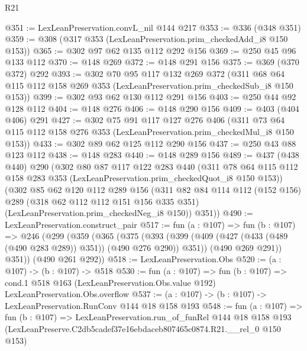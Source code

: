 \begin{lexlean}{R21}
\begin{coremodule}
@351 := LexLeanPreservation.convL_nil @144 @217
@353 := @336 (@348 @351)
@359 := @308 (@317 @353 (LexLeanPreservation.prim_checkedAdd_i8 @150 @153))
@365 := @302 @97 @62 @135 @112 @292 @156
@369 := @250 @45 @96 @133 @112
@370 := @148 @269
@372 := @148 @291 @156
@375 := @369 (@370 @372) @292
@393 := @302
    @70
    @95
    @117
    @132
    @269
    @372
    (@311 @68 @64 @115 @112 @158 @269 @353 (LexLeanPreservation.prim_checkedSub_i8 @150 @153))
@399 := @302 @93 @62 @130 @112 @291 @156
@403 := @250 @44 @92 @128 @112
@404 := @148 @276
@406 := @148 @290 @156
@409 := @403 (@404 @406) @291
@427 := @302
    @75
    @91
    @117
    @127
    @276
    @406
    (@311 @73 @64 @115 @112 @158 @276 @353 (LexLeanPreservation.prim_checkedMul_i8 @150 @153))
@433 := @302 @89 @62 @125 @112 @290 @156
@437 := @250 @43 @88 @123 @112
@438 := @148 @283
@440 := @148 @289 @156
@489 := @437
    (@438 @440)
    @290
    (@302
      @80
      @87
      @117
      @122
      @283
      @440
      (@311 @78 @64 @115 @112 @158 @283 @353 (LexLeanPreservation.prim_checkedQuot_i8 @150 @153))
      (@302
        @85
        @62
        @120
        @112
        @289
        @156
        (@311
          @82
          @84
          @114
          @112
          (@152 @156)
          @289
          (@318 @62 @112 @112 @151 @156 @335 @351)
          (LexLeanPreservation.prim_checkedNeg_i8 @150))
        @351))
@490 := LexLeanPreservation.construct_pair
@517 := fun (a : @107) =>
  fun (b : @107) =>
  @246
    (@299
      (@359
        (@365
          (@375
            (@393 (@399 (@409 (@427 (@433 (@489 (@490 @283 @289)) @351)) (@490 @276 @290)) @351))
            (@490 @269 @291))
          @351))
      (@490 @261 @292))
@518 := LexLeanPreservation.Obs
@520 := (a : @107) -> (b : @107) -> @518
@530 := fun (a : @107) =>
  fun (b : @107) =>
  cond.{1} @518 @163 (LexLeanPreservation.Obs.value @192) LexLeanPreservation.Obs.overflow
@537 := (a : @107) -> (b : @107) -> LexLeanPreservation.RunConv @144 @18 @158 @193
@548 := fun (a : @107) =>
  fun (b : @107) =>
  LexLeanPreservation.run_of_funRel
    @144
    @18
    @158
    @193
    (LexLeanPreserve.C2db5cadef37e16ebdaceb807465c0874.R21.__rel_0 @150 @153)
\end{coremodule}
\end{lexlean}
